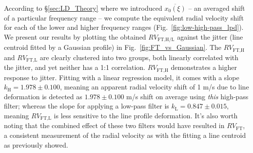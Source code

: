 According to \S\ref{sec:LD_Theory} where we introduced $\overline{x_0(\xi)}$ -- an averaged shift of a particular frequency range -- we compute the equivalent radial velocity shift for each of the lower and higher frequency ranges (Fig.~\ref{fig:low-high-pass_lpd}). We present our results by plotting the obtained $RV_\text{FT,H/L}$ against the jitter (line centroid fitted by a Gaussian profile) in Fig.~\ref{fig:FT_vs_Gaussian}. The $RV_\text{FT,H}$ and $RV_\text{FT,L}$ are clearly clustered into two groups, both linearly correlated with the jitter, and yet neither has a 1:1 correlation. $RV_\text{FT,H}$ demonstrates a higher response to jitter. Fitting with a linear regression model, it comes with a slope $k_\text{H} = 1.978\pm0.100$, meaning an apparent radial velocity shift of 1 m/s due to line deformation is detected as $1.978\pm0.100$ m/s shift on average using \textit{this} high-pass filter; whereas the slope for applying a low-pass filter is $k_\text{L} = 0.847\pm0.015$, meaning $RV_\text{FT,L}$ is less sensitive to the line profile deformation. It's also worth noting that the combined effect of these two filters would have resulted in $RV_\text{FT}$, a consistent measurement of the radial velocity as with the fitting a line centroid as previously showed.

